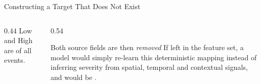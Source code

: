 \begin{frame}[shrink]{Constructing a Target That Does Not Exist}
\begin{columns}[T]
\begin{column}{0.44\textwidth}
      \vspace{1mm}
      {\scriptsize Low and High are  of all events.}
    \end{column}
    \begin{column}{0.54\textwidth}
      \begin{alertblock}{Both source fields are then \emph{removed}}
        \small If left in the feature set, a model would simply re-learn this
        deterministic mapping instead of inferring severity from spatial,
        temporal and contextual signals, and would be .
      \end{alertblock}
    \end{column}
  \end{columns}
\end{frame}
